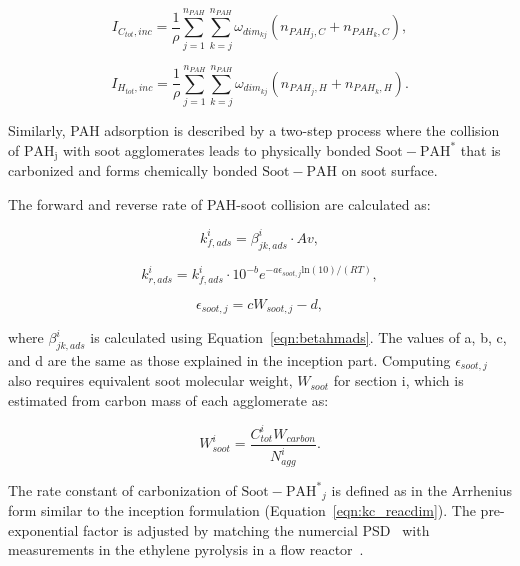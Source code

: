 \begin{equation}
	I_{C_{tot},{inc}} = 
	\frac{1}{\rho}
	\sum_{j=1}^{n_{PAH}} \sum_{k=j}^{n_{PAH}}  \omega_{dim_{kj}} 
	\left(
	n_{PAH_j,C}+n_{PAH_k,C}
	\right),
	\label{eqn:ICtot_inc}
\end{equation}

\begin{equation}
	I_{H_{tot},{inc}} = 
	\frac{1}{\rho}
	\sum_{j=1}^{n_{PAH}} \sum_{k=j}^{n_{PAH}}  \omega_{dim_{kj}} 
	\left(
	n_{PAH_j,H}+n_{PAH_k,H}
	\right).
	\label{eqn:IHtot_inc}
\end{equation}

Similarly, PAH adsorption is described by a two-step process where the collision of $\mathrm{PAH_j}$ with soot agglomerates leads to physically bonded $\mathrm{Soot-PAH^*}$ that is carbonized and forms chemically bonded $\mathrm{Soot-PAH}$ on soot surface.



The forward and reverse rate of PAH-soot collision are calculated as:

\begin{equation}
	k^i_{f,ads}=\beta^i_{jk,ads}\cdot Av,
	\label{eqn:kfads_reacdim}
\end{equation}

\begin{equation}
	k^i_{r,ads}=k^i_{f,ads}\cdot10^{-b}e^{-a\epsilon_{soot,j} \mathrm{ln}(10)/(RT)},
	\label{eqn:krads_reacdim}
\end{equation}

\begin{equation}
	\epsilon_{soot,j} = cW_{soot,j} - d,
	\label{eqn:epsilonads_reacdim}
\end{equation}

\noindent where $\beta^i_{jk,ads}$ is calculated using Equation~\eqref{eqn:betahmads}. The values of a, b, c, and d are the same as those explained in the inception part. Computing ${\epsilon_{soot,j}}$ also requires equivalent soot molecular weight, ${W_{soot}}$ for section i, which is estimated from carbon mass of each agglomerate as:

\begin{equation}
	W^i_{soot}=\frac{C^i_{tot}W_{carbon}}{N^i_{agg}}.
\end{equation}

The rate constant of carbonization of $\mathrm{Soot-PAH^*}_j$ is defined as in the Arrhenius form similar to the inception formulation (Equation~\eqref{eqn:kc_reacdim}). The pre-exponential factor is adjusted by matching the numercial PSD~\citep{naseri2022simulating} with measurements in the ethylene pyrolysis in a flow reactor~\cite{araki2021effects}. 

